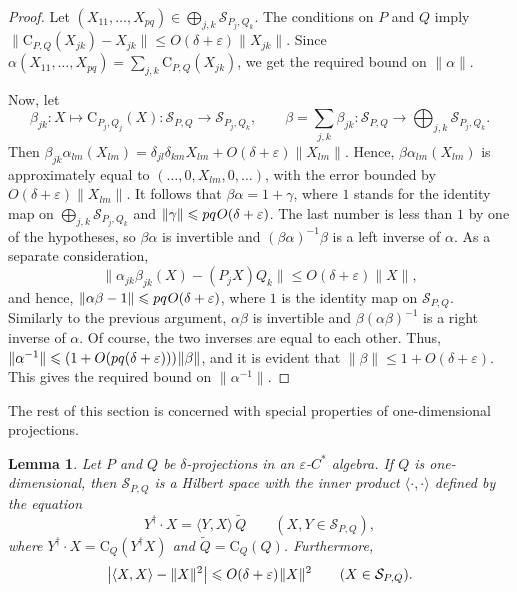 \documentclass[12pt]{article}
\newcommand{\calS}{\mathcal{S}}
\newcommand{\ts}{\mkern1mu}
\newcommand{\Co}{\mathrm{C}}
\newcommand{\wt}{\widetilde}
\newcommand*{\braket}[2]{\langle{#1},{#2}\rangle}
\newcommand{\eps}{\varepsilon}
\renewcommand{\le}{\leqslant}
\newtheorem{Lemma}[Theorem]{Lemma}
\newtheorem[definition]{Definition}[Theorem]{Definition}
\newtheorem[remark]{Example}[Theorem]{Example}
\newtheorem[remark]{Remark}[Theorem]{Remark}
\newtheorem[remark]{Question}[Theorem]{Open question}
\newtheorem*[definition]{definition}{Definition}
\newtheorem*[remark]{example}{Example}
\newtheorem*[remark]{remark}{Remark}
\newtheorem*[remark]{question}{Open question}
\numberwithin{equation}{section}
\begin{document}
\begin{proof}
Let $(X_{11},\dots,X_{pq})\in\bigoplus_{j,k}\calS_{P_j,Q_k}$. The conditions on $P$ and $Q$ imply $\|\Co_{P,Q}(X_{jk})-X_{jk}\|\le O(\delta+\eps)\|X_{jk}\|$. Since $\alpha(X_{11},\dots,X_{pq})=\sum_{j,k}\Co_{P,Q}(X_{jk})$, we get the required bound on $\|\alpha\|$.

Now, let
\[
\beta_{jk}\colon X\mapsto\Co_{P_j,Q_j}(X)
\colon\calS_{P,Q}\to\calS_{P_j,Q_k},\qquad
\beta=\sum_{j,k}\beta_{jk}\colon
\calS_{P,Q}\to\bigoplus_{j,k}\calS_{P_j,Q_k}.
\]
Then $\beta_{jk}\alpha_{lm}(X_{lm}) =\delta_{jl}\delta_{km}X_{lm}+O(\delta+\eps)\|X_{lm}\|$. Hence, $\beta\alpha_{lm}(X_{lm})$ is approximately equal to $(\ldots,0,X_{lm},0,\ldots)$, with the error bounded by $O(\delta+\eps)\|X_{lm}\|$. It follows that $\beta\alpha=1+\gamma$, where $1$ stands for the identity map on $\bigoplus_{j,k}\calS_{P_j,Q_k}$ and $\|\gamma\|\le pq\ts O(\delta+\eps)$. The last number is less than $1$ by one of the hypotheses, so $\beta\alpha$ is invertible and $(\beta\alpha)^{-1}\beta$ is a left inverse of $\alpha$. As a separate consideration,
\[
\|\alpha_{jk}\beta_{jk}(X)-(P_jX)Q_k\|\le O(\delta+\eps)\|X\|,
\]
and hence, $\|\alpha\beta-1\|\le pq\ts O(\delta+\eps)$, where $1$ is the identity map on $\calS_{P,Q}$. Similarly to the previous argument, $\alpha\beta$ is invertible and $\beta(\alpha\beta)^{-1}$ is a right inverse of $\alpha$. Of course, the two inverses are equal to each other. Thus, $\|\alpha^{-1}\|\le (1+O(pq(\delta+\eps)))\ts\|\beta\|$, and it is evident that $\|\beta\|\le 1+O(\delta+\eps)$. This gives the required bound on $\|\alpha^{-1}\|$.
\end{proof}

The rest of this section is concerned with special properties of one-dimensional projections.

\begin{Lemma}\label{lem_PQ_Hilb}
Let $P$ and $Q$ be $\delta$-projections in an $\eps$-$C^*$ algebra. If $Q$ is one-dimensional, then $\calS_{P,Q}$ is a Hilbert space with the inner product $\braket{\cdot}{\cdot}$ defined by the equation
\begin{equation}\label{1dQ_ip}
Y^\dag\cdot X=\braket{Y}{X}\,\wt{Q}\qquad (X,Y\in\calS_{P,Q}),
\end{equation}
where $Y^\dag\cdot X=\Co_{Q}(Y^{\dag}X)$ and $\wt{Q}=\Co_Q(Q)$. Furthermore,
\begin{equation}\label{1dQ_ip_norm}
\bigl|\braket{X}{X}-\|X\|^2\bigr|\le O(\delta+\eps)\ts\|X\|^2\qquad
(X\in\calS_{P,Q}).
\end{equation}
\end{Lemma}
\end{document}
